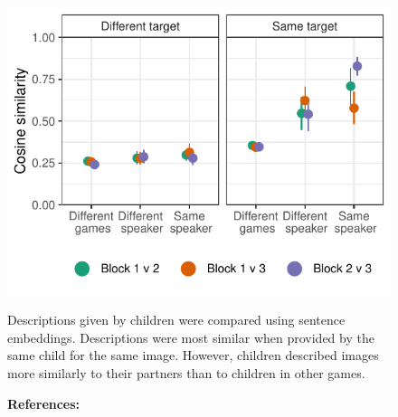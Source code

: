 \documentclass[11pt,a4paper]{article}
\begin{document}
\begin{figure}
\begin{minipage}{.5\textwidth}
		\end{minipage}
		~~~
		\begin{minipage}{.5\textwidth}	
		{\includegraphics[width=\textwidth]{sims.pdf}} 
		\begin{small}
		Descriptions given by children were compared using sentence embeddings. Descriptions were most similar when provided by the same child for the same image. However, children described images more similarly to their partners than to children in other games.  
		\end{small}
		\end{minipage}
	\end{figure}



\begin{figure}\textbf{References:}

\end{figure}
\end{document}
